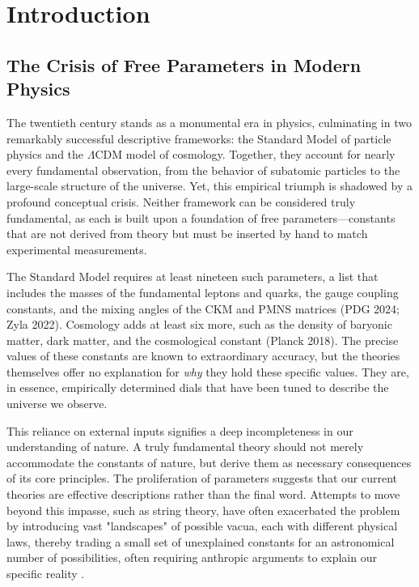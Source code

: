 \section{Introduction}

\subsection{The Crisis of Free Parameters in Modern Physics}
The twentieth century stands as a monumental era in physics, culminating in two remarkably successful descriptive frameworks: the Standard Model of particle physics and the \(\Lambda\)CDM model of cosmology. Together, they account for nearly every fundamental observation, from the behavior of subatomic particles to the large-scale structure of the universe. Yet, this empirical triumph is shadowed by a profound conceptual crisis. Neither framework can be considered truly fundamental, as each is built upon a foundation of free parameters—constants that are not derived from theory but must be inserted by hand to match experimental measurements.

The Standard Model requires at least nineteen such parameters, a list that includes the masses of the fundamental leptons and quarks, the gauge coupling constants, and the mixing angles of the CKM and PMNS matrices (PDG 2024; Zyla 2022). Cosmology adds at least six more, such as the density of baryonic matter, dark matter, and the cosmological constant (Planck 2018). The precise values of these constants are known to extraordinary accuracy, but the theories themselves offer no explanation for \textit{why} they hold these specific values. They are, in essence, empirically determined dials that have been tuned to describe the universe we observe.

This reliance on external inputs signifies a deep incompleteness in our understanding of nature. A truly fundamental theory should not merely accommodate the constants of nature, but derive them as necessary consequences of its core principles. The proliferation of parameters suggests that our current theories are effective descriptions rather than the final word. Attempts to move beyond this impasse, such as string theory, have often exacerbated the problem by introducing vast "landscapes" of possible vacua, each with different physical laws, thereby trading a small set of unexplained constants for an astronomical number of possibilities, often requiring anthropic arguments to explain our specific reality \cite{Susskind2003, Weinberg1987}.

